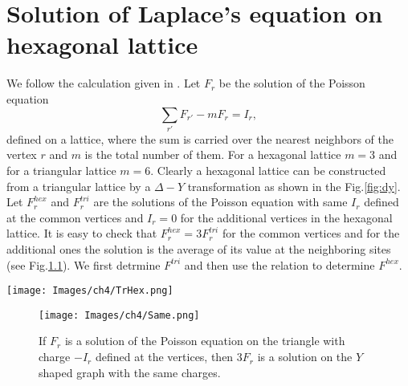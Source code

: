 \documentclass[11pt,a4paper]{book}
\begin{document}
\chapter{Solution of Laplace's equation on hexagonal
lattice\label{ap:laplace}}
We follow the calculation given in \cite{atkinson}.
Let $F_{r}$ be the solution of the Poisson equation
\begin{equation}
\sum_{r'}F_{r'}-mF_{r}=I_{r},
\end{equation}
defined on a lattice, where the sum is carried over the nearest
neighbors of the vertex $r$
and $m$ is the total number of them. For a hexagonal lattice $m=3$ and for a triangular lattice $m=6$.
Clearly a hexagonal lattice can be constructed from a triangular
lattice by a $\Delta-Y$
transformation as shown in the Fig.\ref{fig:dy}. Let $F_{r}^{hex}$ and
$F_{r}^{tri}$ are the solutions of the
Poisson equation with same $I_{r}$ defined at the common vertices and
$I_{r}=0$ for the additional vertices in the
hexagonal lattice. It is easy to check that $F_{r}^{hex}=3F_{r}^{tri}$ for the common vertices and for
the additional ones the solution is the average of its value at the neighboring sites (see Fig.\ref{fig:tran}).
We first detrmine $F^{tri}$ and then use the relation to determine $F^{hex}$.
\begin{SCfigure}
\texttt{[image: Images/ch4/TrHex.png]}
\label{fig:dy}
\caption{A hexagonal lattice can be constructed from a triangular lattice by a $\Delta-Y$ transformation. Blue solid lines form a triangular lattice and the red dotted lines form a hexagonal lattice.}
\end{SCfigure}
\begin{figure}
\begin{center}
\texttt{[image: Images/ch4/Same.png]}
\label{fig:tran}
\caption{If $F_{r}$ is a solution of the Poisson equation on the
triangle with charge $-I_{r}$ defined at the vertices, then $3F_{r}$ is a solution on the $Y$ shaped graph with the same charges.}
\end{center}
\end{figure}
\end{document}
